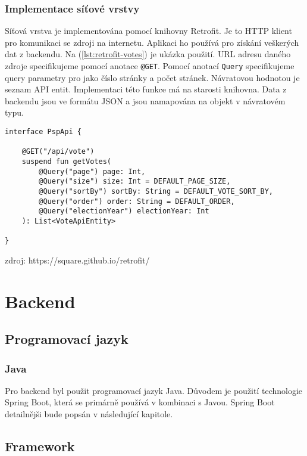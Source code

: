 \subsubsection*{Implementace síťové vrstvy}

\noindent Síťová vrstva je implementována pomocí knihovny Retrofit. Je to HTTP klient pro komunikaci se zdroji na internetu. Aplikaci ho používá pro získání veškerých dat z backendu. Na (\ref{lst:retrofit-votes}) je ukázka použití. URL adresu daného zdroje specifikujeme pomocí anotace \lstinline|@GET|. Pomocí anotací \lstinline|Query| specifikujeme query parametry pro jako číslo stránky a počet stránek. Návratovou hodnotou je seznam API entit. Implementaci této funkce má na starosti knihovna. Data z backendu jsou ve formátu JSON a jsou namapována na objekt v návratovém typu.

\begin{lstlisting}[caption={Ukázka použití knihovny Retrofit pro získání seznamu hlasování z backendu}, label={lst:retrofit-votes}, tabsize=2]
interface PspApi {
	
	@GET("/api/vote")
	suspend fun getVotes(
		@Query("page") page: Int,
		@Query("size") size: Int = DEFAULT_PAGE_SIZE,
		@Query("sortBy") sortBy: String = DEFAULT_VOTE_SORT_BY,
		@Query("order") order: String = DEFAULT_ORDER,
		@Query("electionYear") electionYear: Int
	): List<VoteApiEntity>
	
}
\end{lstlisting}

zdroj: https://square.github.io/retrofit/

\section{Backend}

\subsection {Programovací jazyk}

\subsubsection *{Java}
Pro backend byl použit programovací jazyk Java. Důvodem je použití technologie Spring Boot, která se primárně používá v kombinaci s Javou. Spring Boot detailnějši bude popsán v následující kapitole.

\subsection {Framework}


